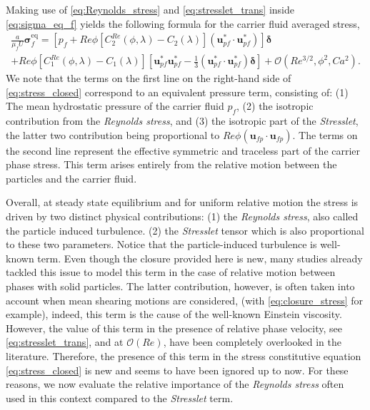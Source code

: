 Making use of \ref{eq:Reynolds_stress} and \ref{eq:stresslet_trans} inside \ref{eq:sigma_eq_f} yields the following formula for the carrier fluid averaged stress, 
\begin{multline}
    \frac{a }{\mu_f U}\bm{\sigma}^\text{eq}_f = 
    \left[ p_f + Re \phi  [C^{Re}_2(\phi,\lambda) - C_2(\lambda)](\textbf{u}_{pf}^*\cdot \textbf{u}_{pf}^*) \right]\bm\delta \\
    + Re \phi [C^{Re}_1(\phi,\lambda) - C_1(\lambda)]\left[
            \textbf{u}_{pf}^*\textbf{u}_{pf}^*
            - \frac{1}{3}(\textbf{u}_{pf}^*\cdot \textbf{u}_{pf}^*)\bm\delta
    \right]
    + \mathcal{O}(Re^{3/2},\phi^2, Ca^2 ).
    \label{eq:stress_closed}
\end{multline} 
We note that the terms on the first line on the right-hand side of \ref{eq:stress_closed} correspond to an equivalent pressure term, consisting of:  
(1) The mean hydrostatic pressure of the carrier fluid $p_f$, 
(2) the isotropic contribution from the \textit{Reynolds stress}, and 
(3) the isotropic part of the \textit{Stresslet}, the latter two contribution being proportional to $Re \phi (\textbf{u}_{fp}\cdot \textbf{u}_{fp})$.  
The terms on the second line represent the effective symmetric and traceless part of the carrier phase stress. 
This term arises entirely from the relative motion between the particles and the carrier fluid. 



Overall, at steady state equilibrium and for uniform relative motion the stress is driven by two distinct physical contributions: 
(1) the \textit{Reynolds stress}, also called the particle induced turbulence. 
(2) the \textit{Stresslet} tensor which is also proportional to these two parameters. 
Notice that the particle-induced turbulence is well-known term. 
Even though the closure provided here is new, many studies already tackled this issue to model this term in the case of relative motion between phases with solid particles. 
The latter contribution, however, is often taken into account when mean shearing motions are considered, (with \ref{eq:closure_stress} for example), indeed, this term is the cause of the well-known Einstein viscosity. 
However, the value of this term in the presence of relative phase velocity, see \ref{eq:stresslet_trans},  and at $\mathcal{O}(Re)$, have been completely overlooked in the literature. 
Therefore, the presence of this term in the stress constitutive equation \eqref{eq:stress_closed}  is new and seems to have been ignored up to now. 
For these reasons, we now evaluate the relative importance of the \textit{Reynolds stress} often used in this context compared to the \textit{Stresslet} term. 


